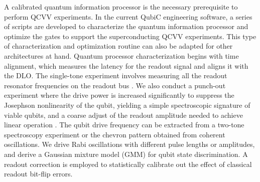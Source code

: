 \documentclass{ieeetran}
\begin{document}

A calibrated quantum information processor is the necessary prerequisite to perform QCVV experiments. 
In the current QubiC engineering software, a series of scripts are developed to characterize the quantum information processor and optimize the gates to support the superconducting QCVV experiments.
This type of characterization and optimization routine can also be adapted for other architectures at hand.
Quantum processor characterization begins with time alignment, which measures the latency for the readout signal and aligns it with the DLO.
The single-tone experiment involves measuring all the readout resonator frequencies on the readout bus \cite{chen2012multiplexed}.
We also conduct a punch-out experiment where the drive power is increased significantly to suppress the Josephson nonlinearity of the qubit, yielding a simple spectroscopic signature of viable qubits, and a coarse adjust of the readout amplitude needed to achieve linear operation \cite{reed2010high}.
The qubit drive frequency can be extracted from a two-tone spectroscopy experiment or the chevron pattern obtained from coherent oscillations.
We drive Rabi oscillations with different pulse lengths or amplitudes, and derive a Gaussian mixture model (GMM) for qubit state discrimination. 
A readout correction is employed to statistically calibrate out the effect of classical readout bit-flip errors.
 


\end{document}
